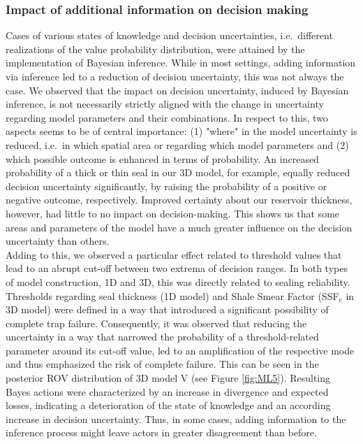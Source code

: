 	\subsubsection{Impact of additional information on decision making}
	Cases of various states of knowledge and decision uncertainties, i.e.\ different realizations of the value probability distribution, were attained by the implementation of Bayesian inference. While in most settings, adding information via inference led to a reduction of decision uncertainty, this was not always the case. We observed that the impact on decision uncertainty, induced by Bayesian inference, is not necessarily strictly aligned with the change in uncertainty regarding model parameters and their combinations. In respect to this, two aspects seems to be of central importance: (1) "where" in the model uncertainty is reduced, i.e.\ in which spatial area or regarding which model parameters and (2) which possible outcome is enhanced in terms of probability. An increased probability of a thick or thin seal in our 3D model, for example, equally reduced decision uncertainty significantly, by raising the probability of a positive or negative outcome, respectively. Improved certainty about our reservoir thickness, however, had little to no impact on decision-making. This shows us that some areas and parameters of the model have a much greater influence on the decision uncertainty than others.\\
	Adding to this, we observed a particular effect related to threshold values that lead to an abrupt cut-off between two extrema of decision ranges. In both types of model construction, 1D and 3D, this was directly related to sealing reliability. Thresholds regarding seal thickness (1D model) and Shale Smear Factor (SSF$_\text{c}$ in 3D model) were defined in a way that introduced a significant possibility of complete trap failure. Consequently, it was observed that reducing the uncertainty in a way that narrowed the probability of a threshold-related parameter around its cut-off value, led to an amplification of the respective mode and thus emphasized the risk of complete failure. This can be seen in the posterior ROV distribution of 3D model V (see Figure \ref{fig:ML5}). Resulting Bayes actions were characterized by an increase in divergence and expected losses, indicating a deterioration of the state of knowledge and an according increase in decision uncertainty. Thus, in some cases, adding information to the inference process might leave actors in greater disagreement than before.

